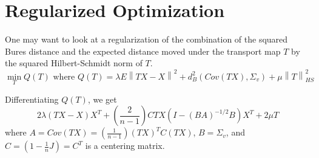 %
%
%
%
%
%

%
\section*{Regularized Optimization}
One may want to look at a regularization of the combination of the squared Bures distance and the expected distance moved under the transport map $T$ by the squared Hilbert-Schmidt norm of $T$.
$$
\min_T Q(T) \textrm{ where }Q(T) = \lambda E \left\| TX-X \right\|^2 + d_B^2(Cov(TX),\Sigma_v) + \mu \left\|T\right\|^2_{HS}
$$

Differentiating $Q(T)$, we get 
$$2\lambda (TX-X)X^{T} + (\frac{2}{n-1})CTX(I-(BA)^{-1/2}B)X^{T} + 2\mu T$$ where $A=Cov(TX)=(\frac{1}{n-1})(TX)^T C(TX)$, $B=\Sigma_v$, and $C=(1-\frac{1}{n}J)=C^T$ is a centering matrix.


